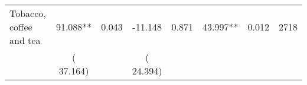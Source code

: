 \begin{tabular}{l*{7}{c}}
 Tobacco, coffee and tea       &             91.088**       &        0.043  &            -11.148       &        0.871  &             43.997**       &              0.012 &  2718 \\ 
                       &       (      37.164)             &                               &       (      24.394)                     &                               &                                               &                                &                      \\ 

\hline \end{tabular}